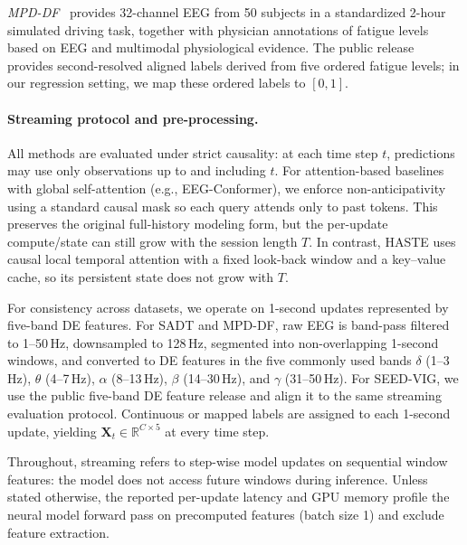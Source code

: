 \documentclass[preprint,12pt]{elsarticle}
\begin{document}
\emph{MPD-DF}~\cite{Li2026MPDDF} provides 32-channel EEG from 50 subjects in a standardized 2-hour simulated driving task, together with physician annotations of fatigue levels based on EEG and multimodal physiological evidence. The public release provides second-resolved aligned labels derived from five ordered fatigue levels; in our regression setting, we map these ordered labels to $[0,1]$.

\paragraph{Streaming protocol and pre-processing.}
All methods are evaluated under strict causality: at each time step $t$, predictions may use only observations up to and including $t$. For attention-based baselines with global self-attention (e.g., EEG-Conformer), we enforce non-anticipativity using a standard causal mask so each query attends only to past tokens. This preserves the original full-history modeling form, but the per-update compute/state can still grow with the session length $T$. In contrast, HASTE uses causal local temporal attention with a fixed look-back window and a key--value cache, so its persistent state does not grow with $T$.

For consistency across datasets, we operate on 1-second updates represented by five-band DE features. For SADT and MPD-DF, raw EEG is band-pass filtered to 1--50\,Hz, downsampled to 128\,Hz, segmented into non-overlapping 1-second windows, and converted to DE features in the five commonly used bands $\delta$ (1--3\,Hz), $\theta$ (4--7\,Hz), $\alpha$ (8--13\,Hz), $\beta$ (14--30\,Hz), and $\gamma$ (31--50\,Hz). For SEED-VIG, we use the public five-band DE feature release and align it to the same streaming evaluation protocol. Continuous or mapped labels are assigned to each 1-second update, yielding $\mathbf{X}_t \in \mathbb{R}^{C \times 5}$ at every time step.

Throughout, streaming refers to step-wise model updates on sequential window features: the model does not access future windows during inference. Unless stated otherwise, the reported per-update latency and GPU memory profile the neural model forward pass on precomputed features (batch size 1) and exclude feature extraction.
\end{document}

